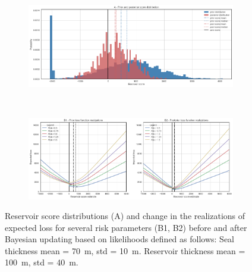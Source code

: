 				\begin{figure}[h]
					\begin{subfigure}{1\textwidth}
						\centering
						\includegraphics[width=1\linewidth]{Figures/update_smallres2.png}
					\end{subfigure}%
					\\
					\begin{subfigure}{1\textwidth}
						\centering
						\includegraphics[width=1\linewidth]{Figures/update_smallres3.png}
					\end{subfigure}
					\caption{Reservoir score distributions (A) and change in the realizations of expected loss for several risk parameters (B1, B2) before and after Bayesian updating based on likelihoods defined as follows: Seal thickness mean = 70~m, std = 10~m. Reservoir thickness mean = 100~m, std = 40~m.}
					\label{fig:update_smallres2_3}
				\end{figure}
						
				
